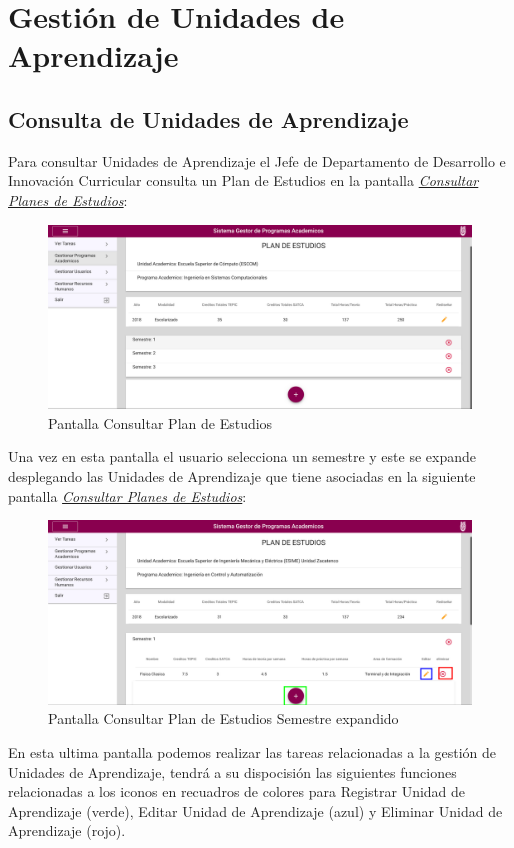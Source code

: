 \section{Gestión de Unidades de Aprendizaje}
    \subsection{Consulta de Unidades de Aprendizaje}
Para consultar Unidades de Aprendizaje el Jefe de Departamento de Desarrollo e Innovación Curricular consulta un Plan de Estudios en la pantalla \hyperlink{consultarS}{\textit{Consultar Planes de Estudios}}:\\
\begin{figure}[H]
    \centering
    \hypertarget{consultarS}{\includegraphics[width=0.7\linewidth]{images/GUA/consultarS}}
    \caption{Pantalla Consultar Plan de Estudios}
    \label{consultarS}
\end{figure}
\clearpage
Una vez en esta pantalla el usuario selecciona un semestre y este se expande desplegando las Unidades de Aprendizaje que tiene asociadas en la siguiente pantalla \hyperlink{consultarUA}{\textit{Consultar Planes de Estudios}}:\\
\begin{figure}[H]
    \centering
    \hypertarget{consultarUA}{\includegraphics[width=0.7\linewidth]{images/GUA/consultarUA}}
    \caption{Pantalla Consultar Plan de Estudios Semestre expandido}
    \label{consultarUA}
\end{figure}
En esta ultima pantalla podemos realizar las tareas relacionadas a la gestión de Unidades de Aprendizaje, tendrá a su dispocisión las siguientes funciones relacionadas a los iconos en recuadros de colores para Registrar Unidad de Aprendizaje (verde), Editar Unidad de Aprendizaje (azul) y Eliminar Unidad de Aprendizaje (rojo).
\clearpage
